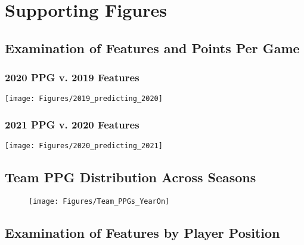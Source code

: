 
\renewcommand{\theHchapter}{\Alph{chapter}}
\renewcommand{\thesection}{\Alph{chapter}.\arabic{section}}
\renewcommand{\thesubsection}{\Alph{chapter}.\arabic{section}.\arabic{subsection}}
\appendix

\chapter{Supporting Figures}
\label{app:supportingFigures}

\section{Examination of Features and Points Per Game}
\label{app:featuresPPG}
\subsection{2020 PPG v. 2019 Features}
\begin{flexfigure}[blanker]
	\centering
	\texttt{[image: Figures/2019\_predicting\_2020]}
	\label{fig:2019predicting2020}
\end{flexfigure}

\subsection{2021 PPG v. 2020 Features}
\begin{flexfigure}[blanker]
	\centering
	\texttt{[image: Figures/2020\_predicting\_2021]}
	\label{fig:2020predicting2021}
\end{flexfigure}

\begin{landscape}
\section{Team PPG Distribution Across Seasons}
	\begin{figure}[h]
		\centering
		\texttt{[image: Figures/Team\_PPGs\_YearOn]}
		\label{fig:teamppgsyearon}
	\end{figure}
\end{landscape}

\section{Examination of Features by Player Position}
\label{app:positionPlots}
